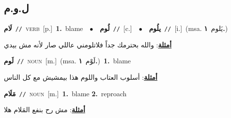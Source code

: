 \documentclass[10pt,a4paper,twoside]{article} %
\begin{document}
\begin{multicols}{2}
\vspace{-3mm}
\subsection*{\color{blue}\foreignlanguage{arabic}{ل.و.م}\color{blue}{}} 

{\setlength\topsep{0pt}\textbf{\foreignlanguage{arabic}{لَام}}\ {\color{gray}\texttt{//}\color{black}}\ \textsc{verb}\ [p.]\ \textbf{1.}~blame\ \ $\bullet$\ \ \setlength\topsep{0pt}\textbf{\foreignlanguage{arabic}{لُوم}}\ {\color{gray}\texttt{//}\color{black}}\ [c.]\ \ $\bullet$\ \ \setlength\topsep{0pt}\textbf{\foreignlanguage{arabic}{يلُوم}}\ {\color{gray}\texttt{//}\color{black}}\ [i.]\ \color{gray}(msa. \foreignlanguage{arabic}{يَلوم}~\foreignlanguage{arabic}{\textbf{١.}})\color{black}\  \begin{flushright}\color{gray}\foreignlanguage{arabic}{\textbf{\underline{\foreignlanguage{arabic}{أمثلة}}}: والله بحترمك جداً فلاتلومني عاللي صار لأنه مش بيدي}\end{flushright}\color{black}} \vspace{2mm}

{\setlength\topsep{0pt}\textbf{\foreignlanguage{arabic}{لَوم}}\ {\color{gray}\texttt{//}\color{black}}\ \textsc{noun}\ [m.]\ \color{gray}(msa. \foreignlanguage{arabic}{لَوْم}~\foreignlanguage{arabic}{\textbf{١.}})\color{black}\ \textbf{1.}~blame\  \begin{flushright}\color{gray}\foreignlanguage{arabic}{\textbf{\underline{\foreignlanguage{arabic}{أمثلة}}}: أسلوب العتاب واللوم هذا بيمشيش مع كل الناس}\end{flushright}\color{black}} \vspace{2mm}

{\setlength\topsep{0pt}\textbf{\foreignlanguage{arabic}{مَلَام}}\ {\color{gray}\texttt{//}\color{black}}\ \textsc{noun}\ [m.]\ \textbf{1.}~blame  \textbf{2.}~reproach\  \begin{flushright}\color{gray}\foreignlanguage{arabic}{\textbf{\underline{\foreignlanguage{arabic}{أمثلة}}}: مش رح بنفع المَلام هلا}\end{flushright}\color{black}} \vspace{2mm}


\end{multicols}
\end{document}

